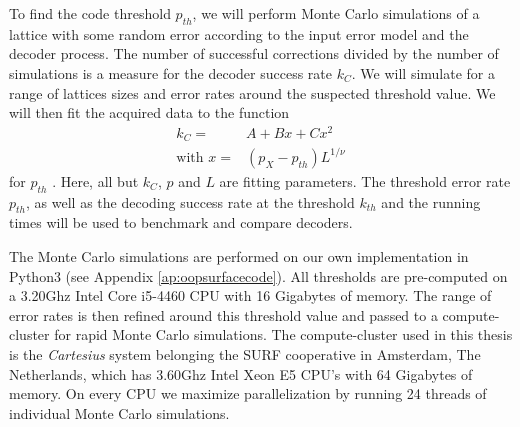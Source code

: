 To find the code threshold $p_{th}$, we will perform Monte Carlo simulations of a lattice with some random error according to the input error model and the decoder process. The number of successful corrections divided by the number of simulations is a measure for the decoder success rate $k_C$. We will simulate for a range of lattices sizes and error rates around the suspected threshold value. We will then fit the acquired data to the function
\begin{align}\label{eq.4.fit}
  \nonumber k_{C} =& A + Bx + Cx^2 \\
  \text{with } x =& (p_X - p_{th})L^{1/\nu}
\end{align}
for $p_{th}$ \cite{wang2003confinement}. Here, all but $k_{C}$, $p$ and $L$ are fitting parameters. The threshold error rate $p_{th}$, as well as the decoding success rate at the threshold $k_{th}$ and the running times will be used to benchmark and compare decoders. 

The Monte Carlo simulations are performed on our own implementation in Python3 (see Appendix \ref{ap:oopsurfacecode}). All thresholds are pre-computed on a 3.20Ghz Intel Core i5-4460 CPU with 16 Gigabytes of memory. The range of error rates is then refined around this threshold value and passed to a compute-cluster for rapid Monte Carlo simulations. The compute-cluster used in this thesis is the \emph{Cartesius} system belonging the SURF cooperative in Amsterdam, The Netherlands, which has 3.60Ghz Intel Xeon E5 CPU's with 64 Gigabytes of memory. On every CPU we maximize parallelization by running 24 threads of individual Monte Carlo simulations. 

